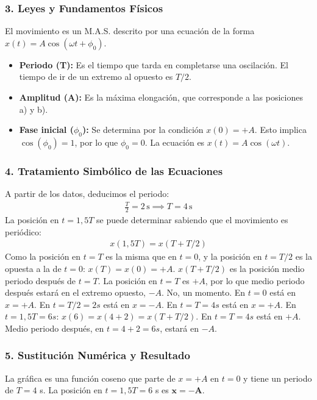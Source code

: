\subsubsection*{3. Leyes y Fundamentos Físicos}
El movimiento es un M.A.S. descrito por una ecuación de la forma $x(t) = A \cos(\omega t + \phi_0)$.
\begin{itemize}
    \item \textbf{Periodo (T):} Es el tiempo que tarda en completarse una oscilación. El tiempo de ir de un extremo al opuesto es $T/2$.
    \item \textbf{Amplitud (A):} Es la máxima elongación, que corresponde a las posiciones a) y b).
    \item \textbf{Fase inicial ($\phi_0$):} Se determina por la condición $x(0)=+A$. Esto implica $\cos(\phi_0)=1$, por lo que $\phi_0=0$. La ecuación es $x(t)=A\cos(\omega t)$.
\end{itemize}

\subsubsection*{4. Tratamiento Simbólico de las Ecuaciones}
A partir de los datos, deducimos el periodo:
\begin{gather}
    \frac{T}{2} = 2\,\text{s} \implies T = 4\,\text{s}
\end{gather}
La posición en $t = 1,5 T$ se puede determinar sabiendo que el movimiento es periódico:
\begin{gather}
    x(1,5 T) = x(T + T/2)
\end{gather}
Como la posición en $t=T$ es la misma que en $t=0$, y la posición en $t=T/2$ es la opuesta a la de $t=0$:
$x(T) = x(0) = +A$.
$x(T+T/2)$ es la posición medio periodo después de $t=T$. La posición en $t=T$ es $+A$, por lo que medio periodo después estará en el extremo opuesto, $-A$.
No, un momento. En $t=0$ está en $x=+A$. En $t=T/2=2s$ está en $x=-A$. En $t=T=4s$ está en $x=+A$.
En $t=1,5T = 6s$: $x(6) = x(4+2) = x(T+T/2)$. En $t=T=4s$ está en $+A$. Medio periodo después, en $t=4+2=6s$, estará en $-A$.

\subsubsection*{5. Sustitución Numérica y Resultado}
\begin{cajaresultado}
La gráfica es una función coseno que parte de $x=+A$ en $t=0$ y tiene un periodo de $T=4$ s. La posición en $t=1,5T=6$ s es $\boldsymbol{x=-A}$.
\end{cajaresultado}

